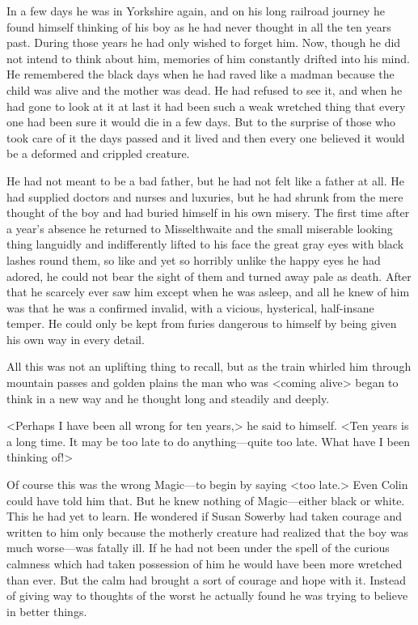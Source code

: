 In a few days he was in Yorkshire again, and on his long railroad journey he found himself thinking of his boy as he had never thought in all the ten years past. During those years he had only wished to forget him. Now, though he did not intend to think about him, memories of him constantly drifted into his mind. He remembered the black days when he had raved like a madman because the child was alive and the mother was dead. He had refused to see it, and when he had gone to look at it at last it had been such a weak wretched thing that every one had been sure it would die in a few days. But to the surprise of those who took care of it the days passed and it lived and then every one believed it would be a deformed and crippled creature.

He had not meant to be a bad father, but he had not felt like a father at all. He had supplied doctors and nurses and luxuries, but he had shrunk from the mere thought of the boy and had buried himself in his own misery. The first time after a year's absence he returned to Misselthwaite and the small miserable looking thing languidly and indifferently lifted to his face the great gray eyes with black lashes round them, so like and yet so horribly unlike the happy eyes he had adored, he could not bear the sight of them and turned away pale as death. After that he scarcely ever saw him except when he was asleep, and all he knew of him was that he was a confirmed invalid, with a vicious, hysterical, half-insane temper. He could only be kept from furies dangerous to himself by being given his own way in every detail.

All this was not an uplifting thing to recall, but as the train whirled him through mountain passes and golden plains the man who was <coming alive> began to think in a new way and he thought long and steadily and deeply.

<Perhaps I have been all wrong for ten years,> he said to himself. <Ten years is a long time. It may be too late to do anything—quite too late. What have I been thinking of!>

Of course this was the wrong Magic—to begin by saying <too late.> Even Colin could have told him that. But he knew nothing of Magic—either black or white. This he had yet to learn. He wondered if Susan Sowerby had taken courage and written to him only because the motherly creature had realized that the boy was much worse—was fatally ill. If he had not been under the spell of the curious calmness which had taken possession of him he would have been more wretched than ever. But the calm had brought a sort of courage and hope with it. Instead of giving way to thoughts of the worst he actually found he was trying to believe in better things.

